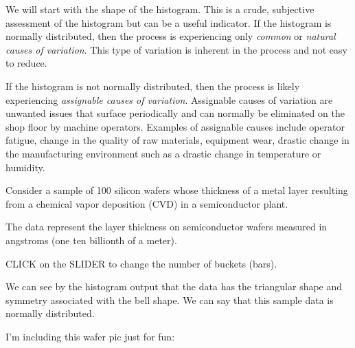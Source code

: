 \documentclass{ximera}
\begin{document}
We will start with the shape of the histogram.  This is a crude, subjective assessment of the histogram but can be a useful indicator.  If the histogram is normally distributed, then the process is experiencing only \emph{common} or \emph{natural causes of variation}. This type of variation is inherent in the process and not easy to reduce.  

If the histogram is not normally distributed, then the process is likely experiencing \emph{assignable causes of variation}.  Assignable causes of variation are unwanted issues that surface periodically and can normally be eliminated on the shop floor by machine operators.  Examples of assignable causes include operator fatigue, change in the quality of raw materials, equipment wear, drastic change in the manufacturing environment such as a drastic change in temperature or humidity.

\begin{exploration}\label{exp:histogram1}
Consider a sample of 100 silicon wafers whose thickness of a metal layer resulting from a chemical vapor deposition (CVD) in a semiconductor plant. 

\begin{center}
      \end{center}


The data represent the layer thickness on semiconductor wafers measured in angstroms (one ten billionth of a meter).


CLICK on the SLIDER to change the number of buckets (bars).

\begin{onlineOnly}
\begin{center} 
\end{center}
\end{onlineOnly}

We can see by the histogram output that the data has the triangular shape and symmetry associated with the bell shape. We can say that this sample data is normally distributed.

I'm including this wafer pic just for fun:


\end{exploration}
\end{document}
